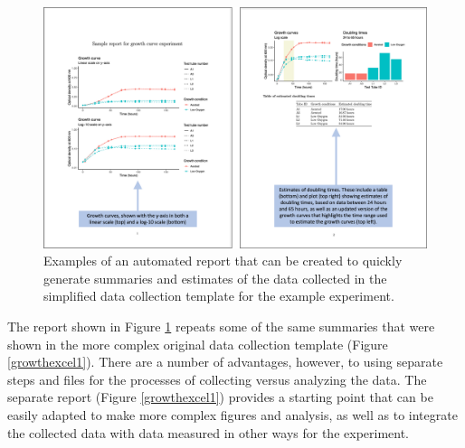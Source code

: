 \documentclass[]{tufte-book}
\begin{document}
\begin{figure}
\includegraphics[width=\textwidth]{figures/growth_curve_report} \caption[Examples of an automated report that can be created to quickly generate summaries and estimates of the data collected in the simplified data collection template for the example experiment]{Examples of an automated report that can be created to quickly generate summaries and estimates of the data collected in the simplified data collection template for the example experiment.}\label{fig:growthreport1}
\end{figure}

The report shown in Figure \ref{fig:growthreport1} repeats some of the same summaries
that were shown in the more complex original data collection template
(Figure \ref{growthexcel1}). There are a number of advantages, however, to using
separate steps and files for the processes of collecting versus analyzing the data.
The separate report (Figure \ref{growthexcel1}) provides a starting point that can
be easily adapted to make more complex figures and analysis, as well as to integrate
the collected data with data measured in other ways for the experiment.
\end{document}
